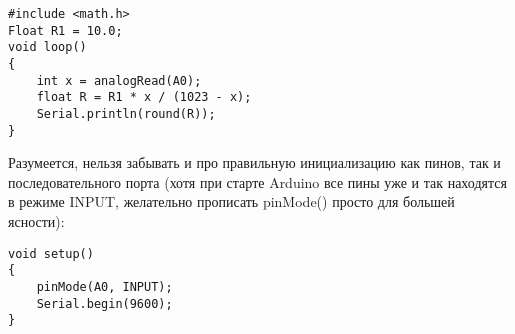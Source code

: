 \begin{verbatim}
#include <math.h>
Float R1 = 10.0;
void loop()
{
    int x = analogRead(A0);
    float R = R1 * x / (1023 - x); 
    Serial.println(round(R));
}
\end{verbatim}

Разумеется, нельзя забывать и про правильную инициализацию как пинов, так и последовательного порта (хотя при старте Arduino все пины уже и так находятся в режиме INPUT, желательно прописать pinMode() просто для большей ясности):

\begin{verbatim}
void setup()
{
    pinMode(A0, INPUT);    
    Serial.begin(9600);
}
\end{verbatim}